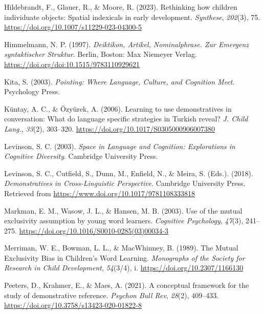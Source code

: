 \documentclass[
  man,floatsintext]{apa6}
\newlength{\cslhangindent}
\newenvironment{CSLReferences}[2] %
 {\begin{list}{}{%
  \setlength{\itemindent}{0pt}
  \setlength{\leftmargin}{0pt}
  \setlength{\parsep}{0pt}
  \ifodd #1
   \setlength{\leftmargin}{\cslhangindent}
   \setlength{\itemindent}{-1\cslhangindent}
  \fi
  \setlength{\itemsep}{#2\baselineskip}}}
 {\end{list}}
\begin{document}
\begin{CSLReferences}{1}{0}
Hildebrandt, F., Glauer, R., \& Moore, R. (2023). Rethinking how children individuate objects: Spatial indexicals in early development. \emph{Synthese}, \emph{202}(3), 75. \url{https://doi.org/10.1007/s11229-023-04300-5}

Himmelmann, N. P. (1997). \emph{Deiktikon, {Artikel}, {Nominalphrase}. {Zur} {Emergenz} syntaktischer {Struktur}}. Berlin, Boston: Max Niemeyer Verlag. \url{https://doi.org/doi:10.1515/9783110929621}

Kita, S. (2003). \emph{Pointing: {Where} {Language}, {Culture}, and {Cognition} {Meet}}. Psychology Press.

Küntay, A. C., \& Özyürek, A. (2006). Learning to use demonstratives in conversation: What do language specific strategies in {Turkish} reveal? \emph{J. Child Lang.}, \emph{33}(2), 303--320. \url{https://doi.org/10.1017/S0305000906007380}

Levinson, S. C. (2003). \emph{Space in {Language} and {Cognition}: {Explorations} in {Cognitive} {Diversity}}. Cambridge University Press.

Levinson, S. C., Cutfield, S., Dunn, M., Enfield, N., \& Meira, S. (Eds.). (2018). \emph{Demonstratives in {Cross}-{Linguistic} {Perspective}}. Cambridge University Press. Retrieved from \url{https://www.doi.org/10.1017/9781108333818}

Markman, E. M., Wasow, J. L., \& Hansen, M. B. (2003). Use of the mutual exclusivity assumption by young word learners. \emph{Cognitive Psychology}, \emph{47}(3), 241--275. \url{https://doi.org/10.1016/S0010-0285(03)00034-3}

Merriman, W. E., Bowman, L. L., \& MacWhinney, B. (1989). The {Mutual} {Exclusivity} {Bias} in {Children}'s {Word} {Learning}. \emph{Monographs of the Society for Research in Child Development}, \emph{54}(3/4), i. \url{https://doi.org/10.2307/1166130}

Peeters, D., Krahmer, E., \& Maes, A. (2021). A conceptual framework for the study of demonstrative reference. \emph{Psychon Bull Rev}, \emph{28}(2), 409--433. \url{https://doi.org/10.3758/s13423-020-01822-8}


\end{CSLReferences}
\end{document}
